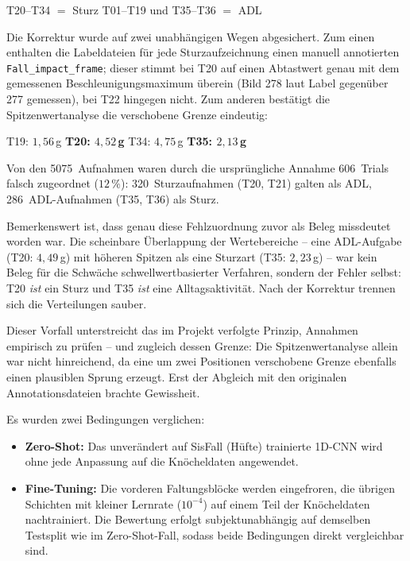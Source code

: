 \documentclass[11pt,a4paper,oneside]{report}
\begin{document}
\begin{center}
T20--T34 $=$ Sturz \qquad T01--T19 und T35--T36 $=$ ADL
\end{center}

Die Korrektur wurde auf zwei unabhängigen Wegen abgesichert. Zum
einen enthalten die Labeldateien für jede Sturzaufzeichnung einen
manuell annotierten \texttt{Fall\_impact\_frame}; dieser stimmt bei
T20 auf einen Abtastwert genau mit dem gemessenen
Beschleunigungsmaximum überein (Bild 278 laut Label gegenüber 277
gemessen), bei T22 hingegen nicht. Zum anderen bestätigt die
Spitzenwertanalyse die verschobene Grenze eindeutig:

\begin{center}
T19: $1{,}56$\,g \quad\textbar\quad \textbf{T20: $4{,}52$\,g} \quad\textbar\quad
T34: $4{,}75$\,g \quad\textbar\quad \textbf{T35: $2{,}13$\,g}
\end{center}

Von den 5075~Aufnahmen waren durch die ursprüngliche Annahme
606~Trials falsch zugeordnet ($12\,\%$): 320~Sturzaufnahmen
(T20, T21) galten als ADL, 286~ADL-Aufnahmen (T35, T36) als Sturz.

Bemerkenswert ist, dass genau diese Fehlzuordnung zuvor als Beleg
missdeutet worden war. Die scheinbare Überlappung der Wertebereiche
-- eine ADL-Aufgabe (T20: $4{,}49$\,g) mit höheren Spitzen als eine
Sturzart (T35: $2{,}23$\,g) -- war kein Beleg für die Schwäche
schwellwertbasierter Verfahren, sondern der Fehler selbst: T20
\emph{ist} ein Sturz und T35 \emph{ist} eine Alltagsaktivität. Nach
der Korrektur trennen sich die Verteilungen sauber.

Dieser Vorfall unterstreicht das im Projekt verfolgte Prinzip,
Annahmen empirisch zu prüfen -- und zugleich dessen Grenze: Die
Spitzenwertanalyse allein war nicht hinreichend, da eine um zwei
Positionen verschobene Grenze ebenfalls einen plausiblen Sprung
erzeugt. Erst der Abgleich mit den originalen Annotationsdateien
brachte Gewissheit.

Es wurden zwei Bedingungen verglichen:

\begin{itemize}
\item \textbf{Zero-Shot:} Das unverändert auf SisFall (Hüfte)
      trainierte 1D-CNN wird ohne jede Anpassung auf die
      Knöcheldaten angewendet.
\item \textbf{Fine-Tuning:} Die vorderen Faltungsblöcke werden
      eingefroren, die übrigen Schichten mit kleiner Lernrate
      ($10^{-4}$) auf einem Teil der Knöcheldaten nachtrainiert.
      Die Bewertung erfolgt subjektunabhängig auf demselben
      Testsplit wie im Zero-Shot-Fall, sodass beide Bedingungen
      direkt vergleichbar sind.
\end{itemize}
\end{document}

